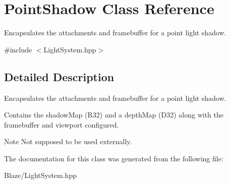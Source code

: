 \hypertarget{classPointShadow}{}\section{Point\+Shadow Class Reference}
\label{classPointShadow}


Encapsulates the attachments and framebuffer for a point light shadow.  




{\ttfamily \#include $<$Light\+System.\+hpp$>$}



\subsection{Detailed Description}
Encapsulates the attachments and framebuffer for a point light shadow. 

Contains the shadow\+Map (R32) and a depth\+Map (D32) along with the framebuffer and viewport configured.

\begin{DoxyNote}{Note}
Not supposed to be used externally. 
\end{DoxyNote}


The documentation for this class was generated from the following file\+:\begin{DoxyCompactItemize}
\item 
Blaze/Light\+System.\+hpp\end{DoxyCompactItemize}
